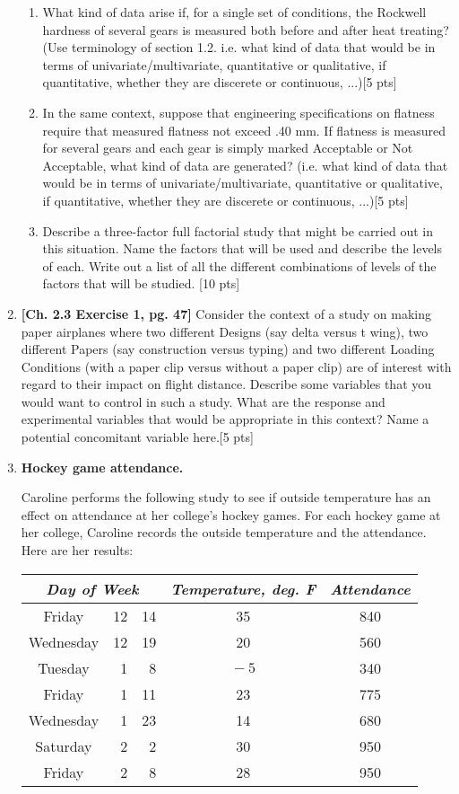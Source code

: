 \documentclass[11pt]{article}\usepackage[]{graphicx}\usepackage[]{color}
\begin{document}
\begin{enumerate}
    \begin{enumerate}
      \item What kind of data arise if, for a single set of conditions, the Rockwell hardness of several gears is measured both before and after heat treating? (Use terminology of section 1.2. i.e. what kind of data that would be in terms of univariate/multivariate, quantitative or qualitative, if quantitative, whether they are discerete or continuous, ...)[5 pts]
      \item In the same context, suppose that engineering specifications on flatness require that measured flatness not exceed .40 mm. If flatness is measured for several gears and each gear is simply marked Acceptable or Not Acceptable, what kind of data are generated? (i.e. what kind of data that would be in terms of univariate/multivariate, quantitative or qualitative, if quantitative, whether they are discerete or continuous, ...)[5 pts]
      \item Describe a three-factor full factorial study that might be carried out in this situation. Name the factors that will be used and describe the levels of each. Write out a list of all the different combinations of levels of the factors that will be studied. [10 pts]
    \end{enumerate}
    
\item \textbf{[Ch. 2.3 Exercise 1, pg. 47]} Consider the context of a study on making paper airplanes where two different Designs (say delta versus t wing), two different Papers (say construction versus typing) and two different Loading Conditions (with a paper clip versus without a paper clip) are of interest with regard to their impact on flight distance. Describe some variables that you would want to control in such a study. What are the response and experimental variables that would be appropriate in this context? Name a potential concomitant variable here.[5 pts]


\item \textbf{Hockey game attendance.}

Caroline performs the following study to see if outside temperature
has an effect on attendance at her college's hockey games. For each
hockey game at her college, Caroline records the outside temperature and the attendance. Here are her results:

\hspace{1in}
\begin{tabular}{|cr@{/}r|c|c|} \hline
\multicolumn{3}{|c|}{\emph{Day of Week}} & \emph{Temperature, deg. F} & \emph{Attendance} \\ \hline
Friday & 12&14 & 35 & 840 \\
Wednesday & 12&19 & 20 & 560 \\
Tuesday & 1&8 & $\!-5$ & 340 \\
Friday & 1&11 & 23 & 775 \\
Wednesday & 1&23 & 14 & 680 \\
Saturday & 2&2 & 30 & 950 \\
Friday & 2&8 & 28 & 950 \\
\hline
\end{tabular}
 

\end{enumerate}
\end{document}
